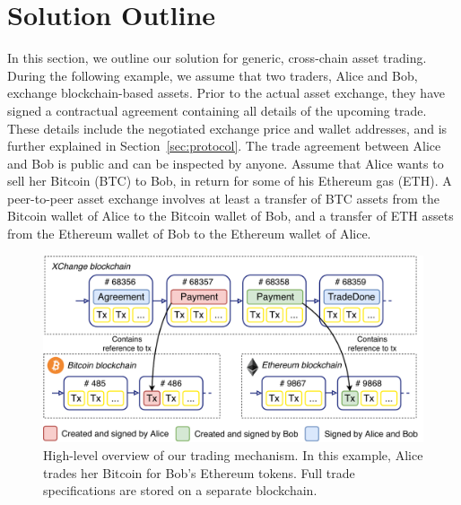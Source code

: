 \section{Solution Outline}
In this section, we outline our solution for generic, cross-chain asset trading.
During the following example, we assume that two traders, Alice and Bob, exchange blockchain-based assets.
Prior to the actual asset exchange, they have signed a contractual agreement containing all details of the upcoming trade.
These details include the negotiated exchange price and wallet addresses, and is further explained in Section~\ref{sec:protocol}.
The trade agreement between Alice and Bob is public and can be inspected by anyone.
Assume that Alice wants to sell her Bitcoin (BTC) to Bob, in return for some of his Ethereum gas (ETH).
A peer-to-peer asset exchange involves at least a transfer of BTC assets from the Bitcoin wallet of Alice to the Bitcoin wallet of Bob, and a transfer of ETH assets from the Ethereum wallet of Bob to the Ethereum wallet of Alice.

\begin{figure}[t]
	\centering
	\includegraphics[width=.9\linewidth]{xchange/assets/xchange}
	\caption{High-level overview of our \ModelName{} trading mechanism. In this example, Alice trades her Bitcoin for Bob's Ethereum tokens. Full trade specifications are stored on a separate blockchain.}
	\label{fig:xchange}
\end{figure}

